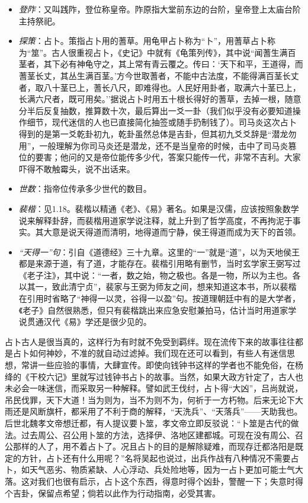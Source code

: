 \documentclass[]{book}
\providecommand{\tightlist}{%
  \setlength{\itemsep}{0pt}\setlength{\parskip}{0pt}}
\begin{document}
\begin{itemize}
\tightlist
\item
  \emph{登阼}：又叫践阼，登位称皇帝。阼原指大堂前东边的台阶，皇帝登上太庙台阶主持祭祀。
\item
  \emph{探策}：占卜。策指占卜用的蓍草。用龟甲占卜称为``卜''，用蓍草占卜称为``筮''。古人很重视占卜，《史记》中就有《龟策列传》，其中说``闻蓍生满百茎者，其下必有神龟守之，其上常有青云覆之。传曰：`天下和平，王道得，而蓍茎长丈，其丛生满百茎。'方今世取蓍者，不能中古法度，不能得满百茎长丈者，取八十茎已上，蓍长八尺，即难得也。人民好用卦者，取满六十茎已上，长满六尺者，既可用矣。''据说占卜时用五十根长得好的蓍草，去掉一根，随意分半后反复抽数，推算数十次，最后算出一爻一卦（我们似乎没有必要知道操作细节，现代迷信的人也已直接简化抽签或随手扔制钱了）。司马炎这次占卜得到的是第一爻乾卦初九，乾卦虽然总体是吉卦，但其初九爻爻辞是``潜龙勿用''，一般理解为你司马炎还是潜龙，还不是当皇帝的时候，击中了司马炎篡位的要害；他问的又是帝位能传多少代，答案只能传一代，非常不吉利。大家吓得不敢触霉头，说不出话来。
\item
  \emph{世数}：指帝位传承多少世代的数目。
\item
  \emph{裴楷}：见1.18。裴楷以精通《老》、《易》著名。如果是汉儒，应该按照象数学说来解释卦辞，而裴楷用道家学说注释，就上升到了哲学高度，不再拘泥于事实。其大意是说天得道而清明，地得道而宁静，侯王得道而成为天下的首领。
\item
  \emph{``天得一''句}：引自《道德经》三十九章。这里的``一''就是``道''，以为天地侯王都是来源于道，有了道，才能存在。裴楷引用略有删节，当时玄学家王弼写过《老子注》，其中说：``一者，数之始，物之极也。各是一物，所以为主也。各以其一，致此清宁贞''，裴家与王弼为师友之间，想来知道这本书，所以裴楷在引用时省略了``神得一以灵，谷得一以盈''句。按道理朝廷中有的是大学者，《老子》自然很熟悉，但只有裴楷跳出来应急安慰兼拍马，估计当时用道家学说贯通汉代《易》学还是很少见的。
\end{itemize}

占卜古人是很当真的，这样行为有时就不免受到羁绊。现在流传下来的故事往往都是占卜如何神妙，不准的就自动过滤掉。我们现在还可以看到，有些人有迷信思想，常讲一些应验的事情，大肆宣传。即使向钱钟书这样的学者也不能免俗，在杨绛的《干校六记》里就写过钱钟书占卜的故事。当然，如果大政方针定了，古人也未必会一味迷信，而采取另一种解释。譬如武王伐纣，占卜得``大凶''，吕尚就说，吊民伐罪，天下大道！当为则为，当不为则不为，何祈于一方朽物。后来无论下大雨还是风断旗杆，都采用了不利于商的解释，``天洗兵''、``天落兵''------天助我也。后世北魏孝文帝想迁都，有人提议要卜筮，孝文帝立即反驳说：``卜筮是古代的做法。过去周公、召公用卜筮的方法，选择伊、洛地区建都城。可现在没有周公、召公那样的人了，用不着占卜了。况且占卜的目的是解除疑难，而现存迁都洛阳是既定的方针，占卜还有什么用呢？''名将吴起也说过，出兵作战有八种情况不需要占卜，如天气恶劣、物质紧缺、人心浮动、兵处险地等，因为一占卜更加可能士气大落。这对我们也很有启示，占卜这个东西，得意时得个凶卦，警醒一下；失意时得个吉卦，保留点希望；倘若以此作为行动指南，必受其害。
\end{document}
